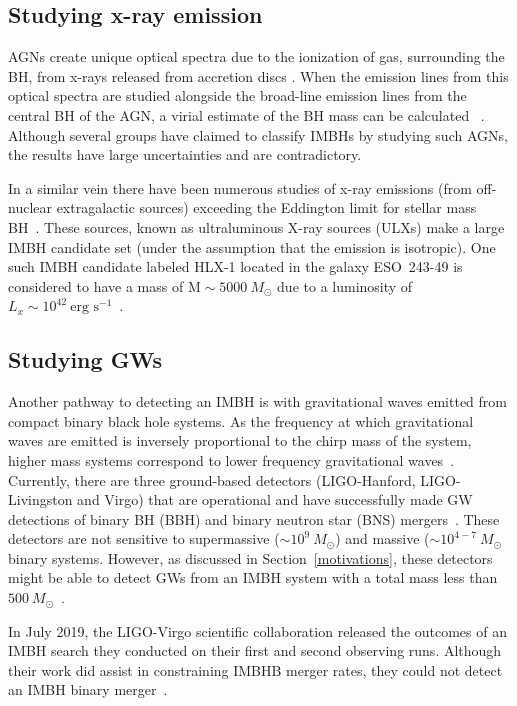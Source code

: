 \subsection{Studying x-ray emission}
AGNs create unique optical spectra due to the ionization of gas,
surrounding the BH, from x-rays released from accretion discs
\citet{elvis2000structure}. When the emission lines from this optical spectra are
studied alongside the broad-line emission lines from the central BH of
the AGN, a virial estimate of the BH mass can be calculated
~\cite{IMBHinLLAGN}. Although several groups have claimed to classify IMBHs
by studying such AGNs, the results have large uncertainties and are
contradictory.

In a similar vein there have been numerous studies of x-ray emissions
(from off-nuclear extragalactic sources) exceeding the Eddington limit
for stellar mass BH~\cite{kaaret2017ultraluminous}. These sources, known as
ultraluminous X-ray sources (ULXs) make a large IMBH candidate set
(under the assumption that the emission is isotropic). One such IMBH
candidate labeled HLX-1 located in the galaxy ESO~243-49 is considered
to have a mass of $\text{M}\sim5000\ M_{\odot}$ due to a luminosity of
$L_x\sim10^{42}\ \text{erg s}^{-1}$~\cite{hlx1}.

\subsection{Studying GWs}
Another pathway to detecting an IMBH is with gravitational waves emitted
from compact binary black hole systems. As the frequency at which
gravitational waves are emitted is inversely proportional to the chirp
mass of the system, higher mass systems correspond to lower frequency
gravitational waves~\cite{abbott2016properties}. Currently, there are three
ground-based detectors (LIGO-Hanford, LIGO-Livingston and Virgo) that
are operational and have successfully made GW detections of binary BH
(BBH) and binary neutron star (BNS) mergers~\cite{abbott2019gwtc}. 
These detectors are not
sensitive to supermassive ($\sim10^9\ M_{\odot}$) and massive
($\sim10^{4-7}\ M_{\odot}$ binary systems. However, as discussed
in Section~\ref{motivations}, these detectors might be able to detect
GWs from an IMBH system with a total mass less than $500\
M_{\odot}$~\cite{salemi2019search}.

In July 2019, the LIGO-Virgo scientific collaboration released the
outcomes of an IMBH search they conducted on their first and second
observing runs. Although their work did assist in constraining IMBHB
merger rates, they could not detect an IMBH binary merger~\cite{salemi2019search}.


